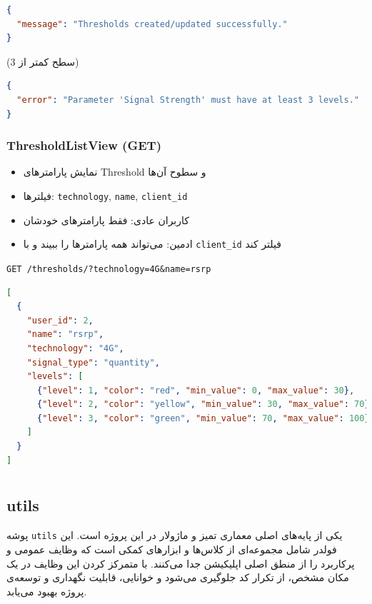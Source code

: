 \documentclass{report}
\begin{document}
\begin{lstlisting}[language=json]
{
  "message": "Thresholds created/updated successfully."
}
\end{lstlisting}

(سطح کمتر از 3)
\begin{lstlisting}[language=json]
{
  "error": "Parameter 'Signal Strength' must have at least 3 levels."
}
\end{lstlisting}

\subsubsection{ThresholdListView (GET)}
\begin{itemize}
    \item نمایش پارامترهای Threshold و سطوح آن‌ها
    \item فیلترها: \texttt{technology}, \texttt{name}, \texttt{client\_id}
    \item کاربران عادی: فقط پارامترهای خودشان
    \item ادمین: می‌تواند همه پارامترها را ببیند و با \texttt{client\_id} فیلتر کند
\end{itemize}

\begin{center}
	\begin{latin}
		\texttt{GET /thresholds/?technology=4G\&name=rsrp}
	\end{latin}
\end{center}

\begin{lstlisting}[language=json]
[
  {
    "user_id": 2,
    "name": "rsrp",
    "technology": "4G",
    "signal_type": "quantity",
    "levels": [
      {"level": 1, "color": "red", "min_value": 0, "max_value": 30},
      {"level": 2, "color": "yellow", "min_value": 30, "max_value": 70},
      {"level": 3, "color": "green", "min_value": 70, "max_value": 100}
    ]
  }
]
\end{lstlisting}
\section{ }

\subsection{  utils}
پوشه \texttt{utils} یکی از پایه‌های اصلی معماری تمیز و ماژولار در این پروژه است. این فولدر شامل مجموعه‌ای از کلاس‌ها و ابزارهای کمکی است که وظایف عمومی و پرکاربرد را از منطق اصلی اپلیکیشن جدا می‌کنند. با متمرکز کردن این وظایف در یک مکان مشخص، از تکرار کد جلوگیری می‌شود و خوانایی، قابلیت نگهداری و توسعه‌ی پروژه بهبود می‌یابد. \\
\end{document}
